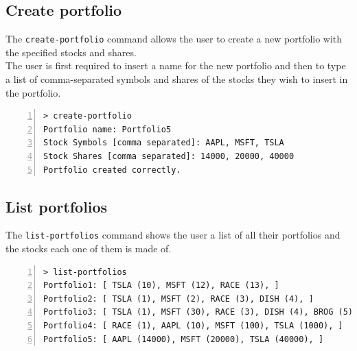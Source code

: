 \subsection{Create portfolio}
The \texttt{create-portfolio} command allows the user to create a new portfolio
with the specified stocks and shares.\\
The user is first required to insert a name for the new portfolio and then to
type a list of comma-separated symbols and shares of the stocks they wish to
insert in the portfolio.
\begin{lstlisting}[basicstyle=\footnotesize\ttfamily,language={},numbers=left,keepspaces=true,tabsize=4,
numberstyle=\footnotesize,numbersep=8pt,frame=single]
> create-portfolio
Portfolio name: Portfolio5
Stock Symbols [comma separated]: AAPL, MSFT, TSLA
Stock Shares [comma separated]: 14000, 20000, 40000
Portfolio created correctly.
\end{lstlisting}
\vspace{-0.6cm}
\subsection{List portfolios}
The \texttt{list-portfolios} command shows the user a list of all their
portfolios and the stocks each one of them is made of.
\begin{lstlisting}[basicstyle=\footnotesize\ttfamily,language={},numbers=left,keepspaces=true,tabsize=4,
numberstyle=\footnotesize,numbersep=8pt,frame=single]
> list-portfolios
Portfolio1: [ TSLA (10), MSFT (12), RACE (13), ]
Portfolio2: [ TSLA (1), MSFT (2), RACE (3), DISH (4), ]
Portfolio3: [ TSLA (1), MSFT (30), RACE (3), DISH (4), BROG (5), ALLO (6), ]
Portfolio4: [ RACE (1), AAPL (10), MSFT (100), TSLA (1000), ]
Portfolio5: [ AAPL (14000), MSFT (20000), TSLA (40000), ]
\end{lstlisting}
\vspace{-0.6cm}
